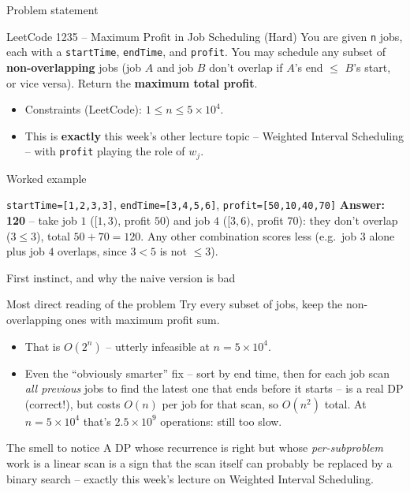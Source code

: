 \documentclass[11pt,aspectratio=169]{beamer}
\begin{document}
\begin{frame}{Problem statement}
  \begin{block}{LeetCode 1235 -- Maximum Profit in Job Scheduling
  (\textcolor{red!60!black}{Hard})}
    You are given \texttt{n} jobs, each with a \texttt{startTime}, \texttt{endTime}, and
    \texttt{profit}. You may schedule any subset of \textbf{non-overlapping} jobs
    (job $A$ and job $B$ don't overlap if $A$'s end $\le$ $B$'s start, or vice versa).
    Return the \textbf{maximum total profit}.
  \end{block}
  \begin{itemize}
    \item Constraints (LeetCode): $1 \le n \le 5\times10^4$.
    \item This is \textbf{exactly} this week's other lecture topic -- Weighted Interval
    Scheduling -- with \texttt{profit} playing the role of $w_j$.
  \end{itemize}
\end{frame}

\begin{frame}{Worked example}
  \begin{block}{\texttt{startTime=[1,2,3,3]}, \texttt{endTime=[3,4,5,6]},
  \texttt{profit=[50,10,40,70]}}
    \textbf{Answer: 120} -- take job $1$ ($[1,3)$, profit $50$) and job $4$ ($[3,6)$,
    profit $70$): they don't overlap ($3 \le 3$), total $50+70=120$. Any other
    combination scores less (e.g.\ job $3$ alone plus job $4$ overlaps, since $3 < 5$
    is not $\le 3$).
  \end{block}
\end{frame}

\begin{frame}{First instinct, and why the naive version is bad}
  \small
  \begin{block}{Most direct reading of the problem}
    Try every subset of jobs, keep the non-overlapping ones with maximum profit sum.
  \end{block}
  \begin{itemize}
    \item That is $O(2^n)$ -- utterly infeasible at $n = 5\times10^4$.
    \item Even the ``obviously smarter'' fix -- sort by end time, then for each job
    scan \emph{all previous} jobs to find the latest one that ends before it starts --
    is a real DP (correct!), but costs $O(n)$ per job for that scan, so
    $O(n^2)$ total. At $n=5\times10^4$ that's $2.5\times10^9$ operations: still too
    slow.
  \end{itemize}
  \begin{alertblock}{The smell to notice}
    A DP whose recurrence is right but whose \emph{per-subproblem} work is a linear
    scan is a sign that the scan itself can probably be replaced by a binary search --
    exactly this week's lecture on Weighted Interval Scheduling.
  \end{alertblock}
\end{frame}
\end{document}
